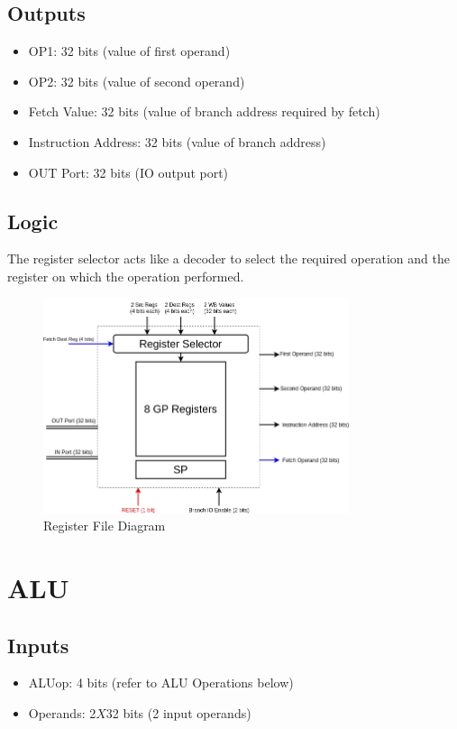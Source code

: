 \subsection{Outputs}
\begin{itemize}
    \item OP1: 32 bits (value of first operand)
    \item OP2: 32 bits (value of second operand)
    \item Fetch Value: 32 bits (value of branch address required by fetch)
    \item Instruction Address: 32 bits (value of branch address)
    \item OUT Port: 32 bits (IO output port)
\end{itemize}

\subsection{Logic}
The register selector acts like a decoder to select the required operation and the register on which the operation performed.

\begin{center}
    \begin{figure}[hp]
        \centering
        \includegraphics[width=0.8\textwidth]{images/reg_file}
        \caption{Register File Diagram}
        \label{fig:reg_file}
    \end{figure}
\end{center}

\section{ALU}

\subsection{Inputs}
\begin{itemize}
    \item ALUop: 4 bits (refer to ALU Operations below)
    \item Operands: 2$X$32 bits (2 input operands)
\end{itemize}

